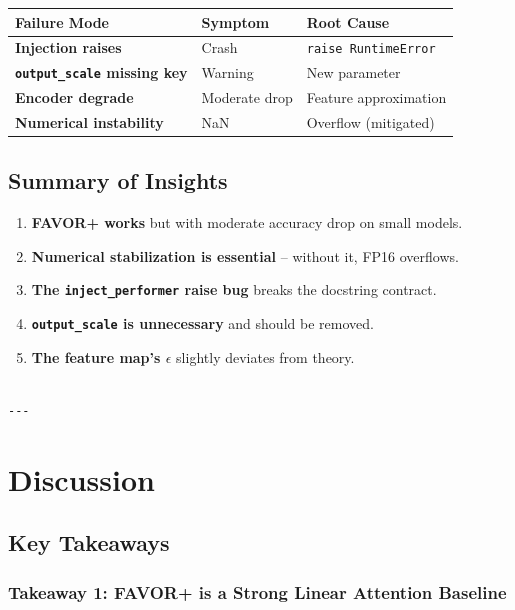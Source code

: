 \begin{table}[H]
\centering
\small
\begin{tabular}{lll}
\toprule
\textbf{Failure Mode} & \textbf{Symptom} & \textbf{Root Cause} \\
\midrule
\textbf{Injection raises} & Crash & \texttt{raise RuntimeError} \\
\textbf{\texttt{output\_scale} missing key} & Warning & New parameter \\
\textbf{Encoder degrade} & Moderate drop & Feature approximation \\
\textbf{Numerical instability} & NaN & Overflow (mitigated) \\
\bottomrule
\end{tabular}
\end{table}

\subsection{Summary of Insights}

\begin{enumerate}
\item \textbf{FAVOR+ works} but with moderate accuracy drop on small models.
\item \textbf{Numerical stabilization is essential} -- without it, FP16 overflows.
\item \textbf{The \texttt{inject\_performer} raise bug} breaks the docstring contract.
\item \textbf{\texttt{output\_scale} is unnecessary} and should be removed.
\item \textbf{The feature map's $\epsilon$} slightly deviates from theory.
\end{enumerate}
\begin{lstlisting}

---
\end{lstlisting}


\section{Discussion}

\subsection{Key Takeaways}

\subsubsection{Takeaway 1: FAVOR+ is a Strong Linear Attention Baseline}

